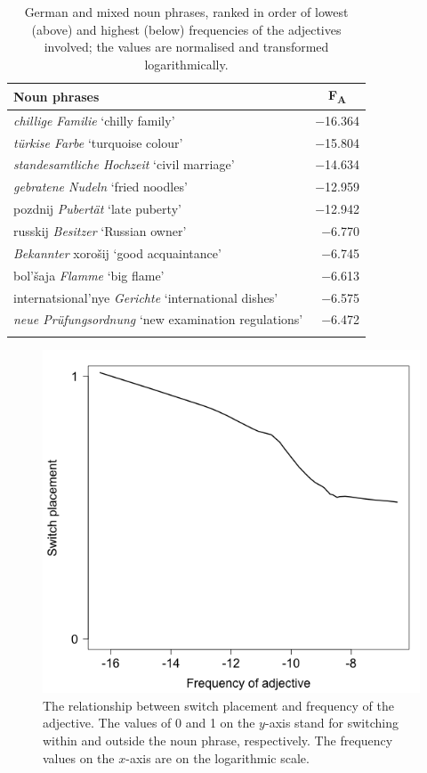 \begin{table}
		\begin{tabular}{lr} 
			\lsptoprule
			Noun phrases	& \multicolumn{1}{c}{F\textsubscript{A}}\\\midrule
			\textit{chillige Familie} `chilly family'	&−16.364\\
			\textit{türkise Farbe} `turquoise colour'	&−15.804\\
			\textit{standesamtliche Hochzeit}	`civil marriage'	&−14.634\\
			\textit{gebratene Nudeln} `fried noodles'	&−12.959\\
			pozdnij \textit{Pubertät} `late puberty' 	&−12.942 \\
			\midrule
			russkij \textit{Besitzer} `Russian owner'	&−6.770\\
			\textit{Bekannter} xorošij `good acquaintance'	&−6.745\\
			bol'šaja \textit{Flamme} `big flame'	&−6.613\\
			internatsional'nye \textit{Gerichte} `international dishes'	&−6.575\\
			\textit{neue Prüfungsordnung} `new examination regulations'		&−6.472\\
			\lspbottomrule 
		\end{tabular}
\caption{German and mixed noun phrases, ranked in order of lowest (above) and highest (below) frequencies of the adjectives involved; the values are normalised and transformed logarithmically.\label{tab:4:4}}
\end{table}


\begin{figure}
	\centering
    	\includegraphics[scale=0.5]{figures/4-Fr_A_ru.png}
	\caption{The relationship between switch placement and frequency of the adjective. The values of 0 and 1 on the $y$-axis stand for switching within and outside the noun phrase, respectively. The frequency values on the $x$-axis are on the logarithmic scale.\label{fig:4:adj_ru}}
\end{figure}

